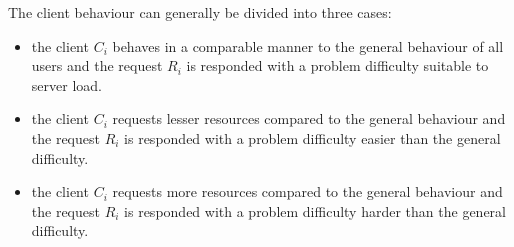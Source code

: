 The client behaviour can generally be divided into three cases:
\begin{itemize}
\item the client $C_i$ behaves in a comparable manner to the general behaviour of all users and the request $R_i$ is responded with a problem difficulty suitable to server load.
\item the client $C_i$ requests lesser resources compared to the general behaviour and the request $R_i$ is responded with a problem difficulty easier than the general difficulty.
\item the client $C_i$ requests more resources compared to the general behaviour and the request $R_i$ is responded with a problem difficulty harder than the general difficulty.
\end{itemize}

